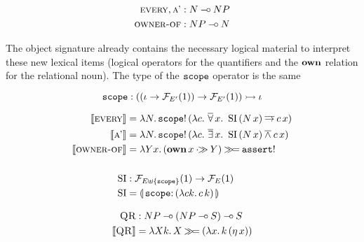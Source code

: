 \begin{align*}
  \textsc{every}, \textsc{a'} &: N \mathbin{{-}\mkern-3.5mu{\circ}} NP \\
  \textsc{owner-of} &: NP \mathbin{{-}\mkern-3.5mu{\circ}} N
\end{align*}

The object signature already contains the necessary logical material to
interpret these new lexical items (logical operators for the quantifiers
and the $\textbf{own}$ relation for the relational noun). The type of the
$\mathtt{scope}$ operator is the same 

$$
\mathtt{scope} : ((\iota \to \mathcal{F}_{E'}(1)) \to \mathcal{F}_{E'}(1)) \rightarrowtail \iota
$$

\begin{align*}
  \lex{every}{\lam{N}{\ap{\op{scope}!}{(\lam{c}{\dforall x.\ \ap{\SI}{(\ap{N}{x})} \dimp \ap{c}{x}})}}} \\
  \lex{a'}{\lam{N}{\ap{\op{scope}!}{(\lam{c}{\dexists x.\ \ap{\SI}{(\ap{N}{x})} \dand \ap{c}{x}})}}} \\
  \lex{owner-of}{\lam{Y x}{(\ap{\obj{own}}{x} \apr Y) \hsbind \op{assert}!}} \\
  \\
  \SI &: \FF_{E \uplus \{\op{scope}\}}(1) \to \FF_E(1) \\
  \SI &= \banana{\onto{\op{scope}}{(\lam{c k}{\ap{c}{k}})}}
\end{align*}




\begin{align*}
  \textsc{QR} &: NP \mathbin{{-}\mkern-3.5mu{\circ}} (NP \mathbin{{-}\mkern-3.5mu{\circ}} S) \mathbin{{-}\mkern-3.5mu{\circ}} S \\
  \llbracket \textsc{QR} \rrbracket &= \lambda X k.\, X \mathbin{\gg\!=} (\lambda x.\, k\,(\eta\,x))
\end{align*}



